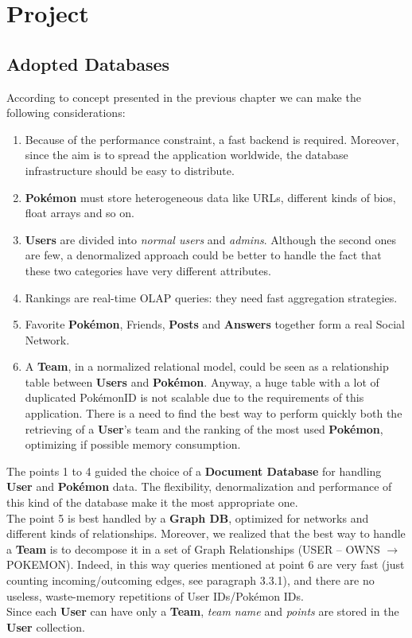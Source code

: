 \section{Project}
\subsection{Adopted Databases}
According to concept presented in the previous chapter we can make the following considerations:
\begin{enumerate}
\item Because of the performance constraint, a fast backend is required. Moreover, since the aim is to spread the application worldwide, the database infrastructure should be easy to distribute.
\item \textbf{Pokémon} must store heterogeneous data like URLs, different kinds of bios, float arrays and so on.
\item \textbf{Users} are divided into \textit{normal users} and \textit{admins}. Although the second ones are few, a denormalized approach could be better to handle the fact that these two categories have very different attributes.
\item Rankings are real-time OLAP queries: they need fast aggregation strategies.
\item Favorite \textbf{Pokémon}, Friends, \textbf{Posts} and \textbf{Answers} together form a real Social Network.
\item A \textbf{Team}, in a normalized relational model, could be seen as a relationship table between \textbf{Users} and \textbf{Pokémon}. Anyway, a huge table with a lot of duplicated PokémonID is not scalable due to the requirements of this application. There is a need to find the best way to perform quickly both the retrieving of a \textbf{User}’s team and the ranking of the most used \textbf{Pokémon}, optimizing if possible memory consumption.
\end{enumerate}

The points 1 to 4 guided the choice of a \textbf{Document Database} for handling \textbf{User} and \textbf{Pokémon} data. The flexibility, denormalization and performance of this kind of the database make it the most appropriate one.\medspace \\

The point 5 is best handled by a \textbf{Graph DB}, optimized for networks and different kinds of relationships. Moreover, we realized that the best way to handle a \textbf{Team} is to decompose it in a set of Graph Relationships (USER – OWNS $\rightarrow$ POKEMON).  Indeed, in this way queries mentioned at point 6 are very fast (just counting incoming/outcoming edges, see paragraph 3.3.1), and there are no useless, waste-memory repetitions of User IDs/Pokémon IDs. \\
Since each \textbf{User} can have only a \textbf{Team}, \textit{team name} and \textit{points} are stored in the \textbf{User} collection.


